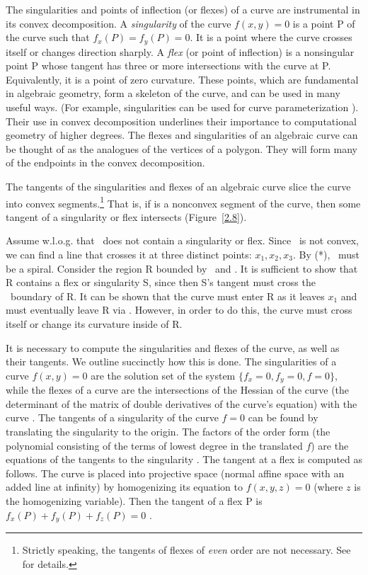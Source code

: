 The singularities and points of inflection (or flexes) of a
curve are instrumental in its convex decomposition.
A {\em singularity} of the curve $f(x,y)=0$ is a point P of the curve
such that $f_{x}(P) = f_{y}(P) = 0$.
It is a point where the curve crosses itself or changes direction sharply.
A {\em flex} (or point of inflection) is a nonsingular point P 
whose tangent has three or more intersections with the curve at P.
Equivalently, it is a point of zero curvature.
These points, which are fundamental in algebraic geometry, form a skeleton
of the curve, and can be used in many useful ways.
(For example, singularities can be used for curve parameterization 
\cite{abba3}).
Their use in convex decomposition underlines their importance to
computational geometry of higher degrees.
The flexes and singularities of an algebraic curve can be thought of as
the analogues of the vertices of a polygon.
They will form many of the endpoints in the convex decomposition.
%
\begin{theorem}
\label{deke}
The tangents of the singularities and flexes of an algebraic curve slice
the curve into convex segments.\footnote{Strictly speaking,
	the tangents of flexes of {\em even} order are not necessary.
	See \cite{jj} for details.}
That is, if  is a nonconvex segment of the curve, then some tangent of 
a singularity or flex intersects  (Figure~\ref{2.8}).
\end{theorem}
Assume w.l.o.g. that \ does
\marginpar{(*)}
not contain a singularity or flex.
Since \ is not convex, we can find a line that crosses it at
three distinct points: $x_{1}, x_{2}, x_{3}$.
By (*), \ must be a spiral.
Consider the region R bounded by \ and .
It is sufficient to show that R contains a flex or singularity S,
since then S's tangent must cross the \ boundary of R.
It can be shown that the curve must enter R as it leaves $x_{1}$ and
must eventually leave R via .
However, in order to do this, the curve must cross itself or change its
curvature inside of R.
\QED

It is necessary to compute the singularities and flexes of the curve, 
as well as their tangents.
We outline succinctly how this is done.
The singularities of a curve $f(x,y)=0$ are the solution set of the system
$\{f_{x}=0,f_{y}=0,f=0\}$,
while the flexes of a curve are the intersections of the
Hessian of the curve (the determinant of the matrix of double derivatives of 
the curve's equation) with the curve \cite{walker}.
The tangents of a singularity of the curve $f=0$ 
can be found by translating the singularity to
the origin. The factors of the order form (the polynomial
consisting of the terms of lowest degree in the translated $f$) are the equations of the tangents to the singularity \cite{walker}.
The tangent at a flex is computed as follows.
The curve is placed into projective space (normal affine
space with an added line at infinity) by homogenizing its equation to
$f(x,y,z)=0$ (where $z$ is the homogenizing variable).
Then the tangent 
of a flex P is $f_{x}(P) + f_{y}(P) + f_{z}(P) = 0$ \cite{walker}.

